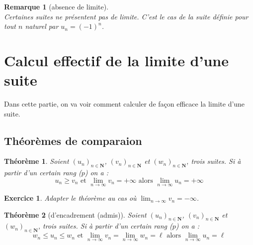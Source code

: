 \documentclass[12pt,a4paper]{article}
\newcommand{\N}{\mathbf{N}}
\theoremstyle{break}
\newtheorem{theoreme}{Théorème}
\theoremstyle{plain}
\newtheorem{exercice}{Exercice}
\theoremstyle{nonumberplain}
\newtheorem{remarque}{Remarque}
\theoremstyle{nonumberbreak}
\begin{document}
\begin{remarque}[absence de limite]~\\
  Certaines suites ne présentent pas de limite. C'est le cas de la suite
  définie pour tout $n$ naturel par $u_n = (-1)^n$.
\end{remarque}

\section{Calcul effectif de la limite d'une suite}

Dans cette partie, on va voir comment calculer de façon efficace la
limite d'une suite.

\subsection{Théorèmes de comparaion}

\begin{theoreme}
  Soient $(u_n)_{n\in\N}$, $(v_n)_{n\in\N}$ et $(w_n)_{n\in\N}$, trois
  suites. Si à partir d'un certain rang ($p$) on a : \[ u_n \geq v_n
    \text{ et } \lim_{n\to\infty} v_n = +\infty \text{ alors }
  \lim_{n\to\infty} u_n = +\infty \]
\end{theoreme}


\begin{exercice}
  Adapter le théorème au cas où $\lim_{n\to\infty} v_n = -\infty$.

\end{exercice}

\begin{theoreme}[d'encadrement (admis)]
  Soient $(u_n)_{n\in\N}$, $(v_n)_{n\in\N}$ et $(w_n)_{n\in\N}$, trois
  suites. Si à partir d'un certain rang ($p$) on a : \[ w_n \leq u_n
    \leq w_n \text{ et } \lim_{n\to\infty} v_n = \lim_{n\to\infty}w_n =
  \ell \text{ alors } \lim_{n\to\infty} u_n = \ell \]
\end{theoreme}
\end{document}
